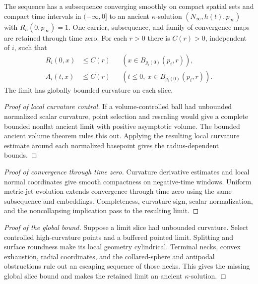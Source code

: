 \begin{theorem}
\label{thm:ancient-compactness}
The sequence has a subsequence converging smoothly on compact spatial
sets and compact time intervals in $(-\infty,0]$ to an ancient
$\kappa$-solution $(N_\infty,h(t),p_\infty)$ with
$R_h(0,p_\infty)=1$.  One carrier, subsequence, and family of
convergence maps are retained through time zero.
For each $r>0$ there is $C(r)>0$, independent of $i$, such that
\[
 \begin{aligned}
 R_i(0,x)&\leq C(r) &&(x\in B_{g_i(0)}(p_i,r)),\\
 A_i(t,x)&\leq C(r) &&(t\leq0,\ x\in B_{g_i(0)}(p_i,r)).
 \end{aligned}
\]
The limit has globally bounded curvature on each slice.
\end{theorem}
\begin{proof}[Proof of local curvature control]
If a volume-controlled ball had unbounded normalized scalar curvature, point
selection and rescaling would give a complete bounded nonflat ancient limit
with positive asymptotic volume. The bounded ancient volume theorem rules this
out. Applying the resulting local curvature estimate around each normalized
basepoint gives the radius-dependent bounds.
\end{proof}
\begin{proof}[Proof of convergence through time zero]
Curvature derivative estimates and local normal coordinates give smooth
compactness on negative-time windows. Uniform metric-jet evolution extends
convergence through time zero using the same subsequence and embeddings.
Completeness, curvature sign, scalar normalization, and the noncollapsing
implication pass to the resulting limit.
\end{proof}
\begin{proof}[Proof of the global bound]
Suppose a limit slice had unbounded curvature. Select controlled
high-curvature points and a buffered pointed limit. Splitting and surface
roundness make its local geometry cylindrical. Terminal necks, convex
exhaustion, radial coordinates, and the collared-sphere and antipodal
obstructions rule out an escaping sequence of those necks. This gives the
missing global slice bound and makes the retained limit an ancient
$\kappa$-solution.
\end{proof}

